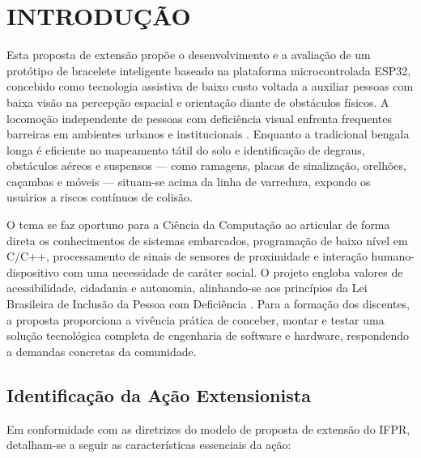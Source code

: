 \chapter{INTRODUÇÃO}
\label{capitulo-introducao-proposta}

Esta proposta de extensão propõe o desenvolvimento e a avaliação de um protótipo de bracelete inteligente baseado na plataforma microcontrolada ESP32, concebido como tecnologia assistiva de baixo custo voltada a auxiliar pessoas com baixa visão na percepção espacial e orientação diante de obstáculos físicos. A locomoção independente de pessoas com deficiência visual enfrenta frequentes barreiras em ambientes urbanos e institucionais \cite{oms2019vision}. Enquanto a tradicional bengala longa é eficiente no mapeamento tátil do solo e identificação de degraus, obstáculos aéreos e suspensos --- como ramagens, placas de sinalização, orelhões, caçambas e móveis --- situam-se acima da linha de varredura, expondo os usuários a riscos contínuos de colisão.

O tema se faz oportuno para a Ciência da Computação ao articular de forma direta os conhecimentos de sistemas embarcados, programação de baixo nível em C/C++, processamento de sinais de sensores de proximidade e interação humano-dispositivo com uma necessidade de caráter social. O projeto engloba valores de acessibilidade, cidadania e autonomia, alinhando-se aos princípios da Lei Brasileira de Inclusão da Pessoa com Deficiência \cite{brasil2015lbi}. Para a formação dos discentes, a proposta proporciona a vivência prática de conceber, montar e testar uma solução tecnológica completa de engenharia de software e hardware, respondendo a demandas concretas da comunidade.

\section{Identificação da Ação Extensionista}
\label{sec:identificacao-acao-proposta}

Em conformidade com as diretrizes do modelo de proposta de extensão do IFPR, detalham-se a seguir as características essenciais da ação:

